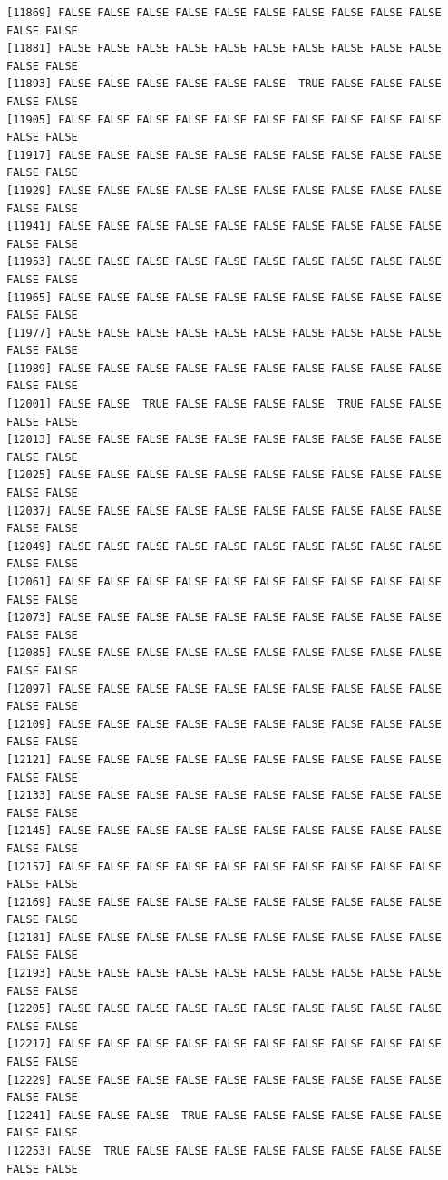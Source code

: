 \documentclass[
  a4paper,
  DIV=11,
  numbers=noendperiod]{scrartcl}
\begin{document}
\begin{verbatim}
[11869] FALSE FALSE FALSE FALSE FALSE FALSE FALSE FALSE FALSE FALSE FALSE FALSE
[11881] FALSE FALSE FALSE FALSE FALSE FALSE FALSE FALSE FALSE FALSE FALSE FALSE
[11893] FALSE FALSE FALSE FALSE FALSE FALSE  TRUE FALSE FALSE FALSE FALSE FALSE
[11905] FALSE FALSE FALSE FALSE FALSE FALSE FALSE FALSE FALSE FALSE FALSE FALSE
[11917] FALSE FALSE FALSE FALSE FALSE FALSE FALSE FALSE FALSE FALSE FALSE FALSE
[11929] FALSE FALSE FALSE FALSE FALSE FALSE FALSE FALSE FALSE FALSE FALSE FALSE
[11941] FALSE FALSE FALSE FALSE FALSE FALSE FALSE FALSE FALSE FALSE FALSE FALSE
[11953] FALSE FALSE FALSE FALSE FALSE FALSE FALSE FALSE FALSE FALSE FALSE FALSE
[11965] FALSE FALSE FALSE FALSE FALSE FALSE FALSE FALSE FALSE FALSE FALSE FALSE
[11977] FALSE FALSE FALSE FALSE FALSE FALSE FALSE FALSE FALSE FALSE FALSE FALSE
[11989] FALSE FALSE FALSE FALSE FALSE FALSE FALSE FALSE FALSE FALSE FALSE FALSE
[12001] FALSE FALSE  TRUE FALSE FALSE FALSE FALSE  TRUE FALSE FALSE FALSE FALSE
[12013] FALSE FALSE FALSE FALSE FALSE FALSE FALSE FALSE FALSE FALSE FALSE FALSE
[12025] FALSE FALSE FALSE FALSE FALSE FALSE FALSE FALSE FALSE FALSE FALSE FALSE
[12037] FALSE FALSE FALSE FALSE FALSE FALSE FALSE FALSE FALSE FALSE FALSE FALSE
[12049] FALSE FALSE FALSE FALSE FALSE FALSE FALSE FALSE FALSE FALSE FALSE FALSE
[12061] FALSE FALSE FALSE FALSE FALSE FALSE FALSE FALSE FALSE FALSE FALSE FALSE
[12073] FALSE FALSE FALSE FALSE FALSE FALSE FALSE FALSE FALSE FALSE FALSE FALSE
[12085] FALSE FALSE FALSE FALSE FALSE FALSE FALSE FALSE FALSE FALSE FALSE FALSE
[12097] FALSE FALSE FALSE FALSE FALSE FALSE FALSE FALSE FALSE FALSE FALSE FALSE
[12109] FALSE FALSE FALSE FALSE FALSE FALSE FALSE FALSE FALSE FALSE FALSE FALSE
[12121] FALSE FALSE FALSE FALSE FALSE FALSE FALSE FALSE FALSE FALSE FALSE FALSE
[12133] FALSE FALSE FALSE FALSE FALSE FALSE FALSE FALSE FALSE FALSE FALSE FALSE
[12145] FALSE FALSE FALSE FALSE FALSE FALSE FALSE FALSE FALSE FALSE FALSE FALSE
[12157] FALSE FALSE FALSE FALSE FALSE FALSE FALSE FALSE FALSE FALSE FALSE FALSE
[12169] FALSE FALSE FALSE FALSE FALSE FALSE FALSE FALSE FALSE FALSE FALSE FALSE
[12181] FALSE FALSE FALSE FALSE FALSE FALSE FALSE FALSE FALSE FALSE FALSE FALSE
[12193] FALSE FALSE FALSE FALSE FALSE FALSE FALSE FALSE FALSE FALSE FALSE FALSE
[12205] FALSE FALSE FALSE FALSE FALSE FALSE FALSE FALSE FALSE FALSE FALSE FALSE
[12217] FALSE FALSE FALSE FALSE FALSE FALSE FALSE FALSE FALSE FALSE FALSE FALSE
[12229] FALSE FALSE FALSE FALSE FALSE FALSE FALSE FALSE FALSE FALSE FALSE FALSE
[12241] FALSE FALSE FALSE  TRUE FALSE FALSE FALSE FALSE FALSE FALSE FALSE FALSE
[12253] FALSE  TRUE FALSE FALSE FALSE FALSE FALSE FALSE FALSE FALSE FALSE FALSE

\end{verbatim}
\end{document}
